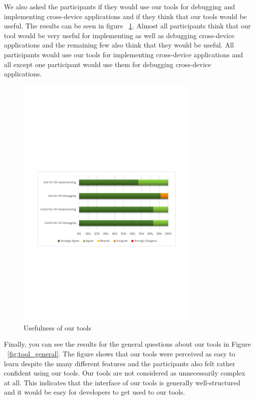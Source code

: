 We also asked the participants if they would use our tools for debugging and implementing cross-device applications and if they think that our tools would be useful. The results can be seen in figure ~\ref{fig:usefulness_tool}. Almost all participants think that our tool would be very useful for implementing as well as debugging cross-device applications and the remaining few also think that they would be useful. All participants would use our tools for implementing cross-device applications and all except one participant would use them for debugging cross-device applications.

\begin{figure}[H]
  \centering
    \includegraphics[width=0.8\textwidth]{images/charts/usefulness_tool.pdf}
	\caption{Usefulness of our tools}
	\label{fig:usefulness_tool}
\end{figure}

Finally, you can see the results for the general questions about our tools in Figure ~\ref{fig:tool_general}. The figure shows that our tools were perceived as easy to learn despite the many different features and the participants also felt rather confident using our tools. Our tools are not considered as unnecessarily complex at all. This indicates that the interface of our tools is generally well-structured and it would be easy for developers to get used to our tools.

